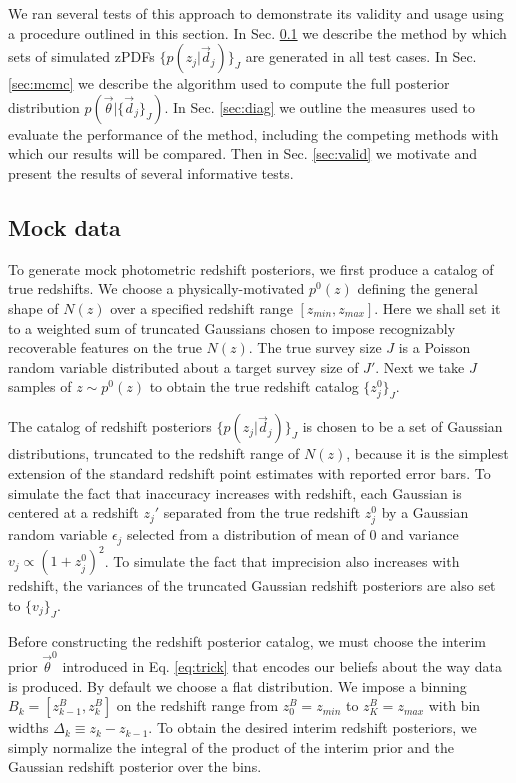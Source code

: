 \documentclass[preprint]{aastex}
\begin{document}
We ran several tests of this approach to demonstrate its validity and usage 
using a procedure outlined in this section.  In Sec. \ref{sec:mock} we describe 
the method by which sets of simulated zPDFs $\{p(z_{j}|\vec{d}_{j})\}_{J}$ are 
generated in all test cases.  In Sec. \ref{sec:mcmc} we describe the algorithm 
used to compute the full posterior distribution 
$p(\vec{\theta}|\{\vec{d}_{j}\}_{J})$.  In Sec. \ref{sec:diag} we outline the 
measures used to evaluate the performance of the method, including the 
competing methods with which our results will be compared.  Then in Sec. 
\ref{sec:valid} we motivate and present the results of several informative 
tests.

\clearpage
\subsection{Mock data}
\label{sec:mock}

To generate mock photometric redshift posteriors, we first produce a catalog of 
true redshifts.  We choose a physically-motivated $p^{0}(z)$ defining the 
general shape of $N(z)$ over a specified redshift range $[z_{min},z_{max}]$.  
Here we shall set it to a weighted sum of truncated Gaussians chosen to impose 
recognizably recoverable features on the true $N(z)$.  The true survey size $J$ 
is a Poisson random variable distributed about a target survey size of $J'$.  
Next we take $J$ samples of $z\sim p^{0}(z)$ to obtain the true redshift 
catalog $\{z_{j}^{0}\}_{J}$.  

The catalog of redshift posteriors $\{p(z_{j}|\vec{d}_{j})\}_{J}$ is chosen to 
be a set of Gaussian distributions, truncated to the redshift range of $N(z)$, 
because it is the simplest extension of the standard redshift point estimates 
with reported error bars.  To simulate the fact that inaccuracy increases with 
redshift, each Gaussian is centered at a redshift $z_{j}'$ separated from the 
true redshift $z_{j}^{0}$ by a Gaussian random variable $\epsilon_{j}$ selected 
from a distribution of mean of 0 and variance $v_{j}\propto(1+z_{j}^{0})^{2}$.  
To simulate the fact that imprecision also increases with redshift, the 
variances of the truncated Gaussian redshift posteriors are also set to 
$\{v_{j}\}_{J}$.

Before constructing the redshift posterior catalog, we must choose the interim 
prior $\vec{\theta}^{0}$ introduced in Eq. \ref{eq:trick} that encodes our 
beliefs about the way data is produced.  By default we choose a flat 
distribution. We impose a binning $B_{k}=[z^{B}_{k-1},z^{B}_{k}]$ on the 
redshift range from $z^{B}_{0}=z_{min}$ to $z^{B}_{K}=z_{max}$ with bin widths 
$\Delta_{k}\equiv z_{k}-z_{k-1}$.  To obtain the desired interim redshift 
posteriors, we simply normalize the integral of the product of the interim 
prior and the Gaussian redshift posterior over the bins.  
\end{document}
